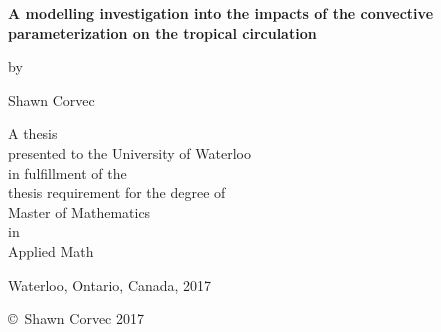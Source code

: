 \pagestyle{empty}

\begin{titlepage}
        \begin{center}
        \vspace*{1.0cm}

        \Huge
        {\bf{A modelling investigation into the impacts of the convective parameterization on the tropical circulation} }

        \vspace*{1.0cm}

        \normalsize
        by \\

        \vspace*{1.0cm}

        \Large
        Shawn Corvec\\

        \vspace*{3.0cm}

        \normalsize
        A thesis \\
        presented to the University of Waterloo \\ 
        in fulfillment of the \\
        thesis requirement for the degree of \\
        Master of Mathematics \\
        in \\
        Applied Math \\

        \vspace*{2.0cm}

        Waterloo, Ontario, Canada, 2017 \\

        \vspace*{1.0cm}

        \copyright\ Shawn Corvec 2017 \\
        \end{center}
\end{titlepage}

\pagestyle{plain}
\setcounter{page}{2}

